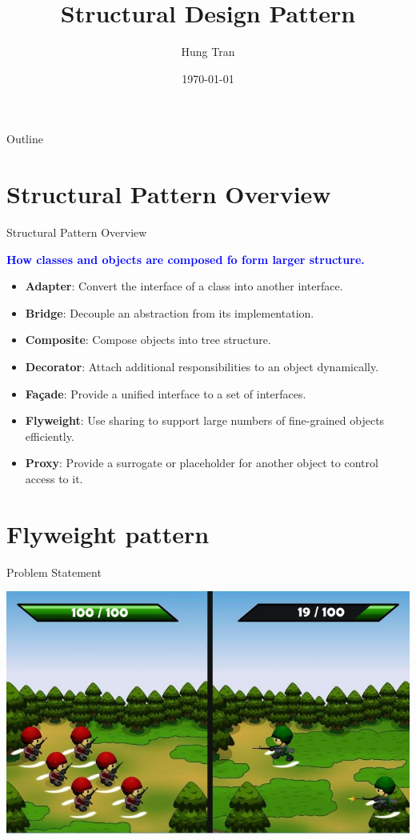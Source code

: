 \documentclass[13pt]{beamer}
\title[Design Pattern]{Structural Design Pattern}
\author{Hung Tran}
\institute{Fpt software}
\date{\today}
\begin{document}
\begin{frame}
\titlepage
\end{frame}

\begin{frame}{Outline}
\tableofcontents
\end{frame}

\section{Structural Pattern Overview}

\begin{frame}{Structural Pattern Overview}
	\begin{center}
	\textcolor{blue}{\textbf{How classes and objects are composed fo form larger structure.}}
	\end{center}
	\begin{itemize}
		\item \textbf{Adapter}: Convert the interface of a class into another interface.
		\item \textbf{Bridge}: Decouple an abstraction from its implementation.
		\item \textbf{Composite}: Compose objects into tree structure.
		\item \textbf{Decorator}: Attach additional responsibilities to an object dynamically.
		\item \textbf{Façade}: Provide a unified interface to a set of interfaces.
		\item \textbf{Flyweight}: Use sharing to support large numbers of fine-grained objects efficiently.
		\item \textbf{Proxy}: Provide a surrogate or placeholder for another object to control access to it.
	\end{itemize}
\end{frame}

\section{Flyweight pattern}

\begin{frame}{Problem Statement}
\begin{center}
	\includegraphics[scale=0.55]{./images/problem.jpg}
\end{center}
\end{frame}
\end{document}
